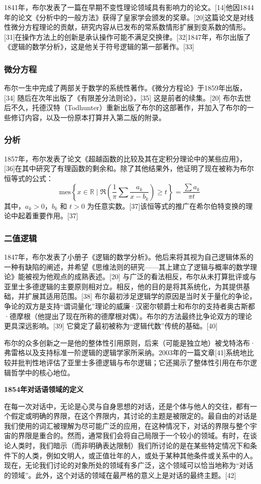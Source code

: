 1841年，布尔发表了一篇在早期不变性理论领域具有影响力的论文。[14]他因1844年的论文《分析中的一般方法》获得了皇家学会颁发的奖章。[20]这篇论文是对线性微分方程理论的贡献，研究内容从已发布的常系数情形扩展到变系数的情形。[31]在操作方法上的创新是承认操作可能不满足交换律。[32]1847年，布尔出版了《逻辑的数学分析》，这是他关于符号逻辑的第一部著作。[33]
\subsubsection{微分方程}  
布尔一生中完成了两部关于数学的系统性著作。《微分方程论》于1859年出版，[34] 随后在次年出版了《有限差分法则论》，[35] 这是前者的续集。[20] 布尔去世后不久，托德汉特（Todhunter）重新出版了布尔的这部著作，并加入了布尔的一些修订内容，以及一份原本打算并入第二版的附录。
\subsubsection{分析}  
1857年，布尔发表了论文《超越函数的比较及其在定积分理论中的某些应用》，[36]在其中研究了有理函数的剩余和。除了其他结果外，他证明了现在被称为布尔恒等式的公式：
\[
\mathrm{mes} \left\{ x \in \mathbb{R} \mid \Re \left( \frac{1}{\pi} \sum \frac{a_k}{x - b_k} \right) \geq t \right\} = \frac{\sum a_k}{\pi t}~
\]
其中，\( a_k > 0 \)，\( b_k \) 和 \( t > 0 \) 为任意实数。[37]该恒等式的推广在希尔伯特变换的理论中起着重要作用。[37]
\subsubsection{二值逻辑}  
1847年，布尔发表了小册子《逻辑的数学分析》。他后来将其视为自己逻辑体系的一种有缺陷的阐述，并希望《思维法则的研究——其上建立了逻辑与概率的数学理论》能被视为他观点的成熟表述。[20] 与广泛的看法相反，布尔从未打算批评或与亚里士多德逻辑的主要原则相对立。相反，他的目的是将其系统化，为其提供基础，并扩展其适用范围。[38] 布尔最初涉足逻辑学的原因是当时关于量化的争论，争论的双方是支持“谓词量化”理论的威廉·汉密尔顿爵士和布尔的支持者奥古斯都·德摩根（他提出了现在所称的德摩根对偶）。布尔的方法最终比争论双方的理论更具深远影响。[39] 它奠定了最初被称为“逻辑代数”传统的基础。[40]

布尔的众多创新之一是他的整体性引用原则，后来（可能是独立地）被戈特洛布·弗雷格以及支持标准一阶逻辑的逻辑学家所采纳。2003年的一篇文章[41]系统地比较并批判性地评估了亚里士多德逻辑与布尔逻辑；它还揭示了整体性引用在布尔逻辑哲学中的核心地位。

\textbf{1854年对话语领域的定义}  

在每一次对话中，无论是心灵与自身思想的对话，还是个体与他人的交往，都有一个假定或明确的界限，在这个界限内，其讨论的主题是被限定的。最自由的对话是我们使用的词汇被理解为尽可能广泛的应用，在这种情况下，对话的界限与整个宇宙的界限是重合的。然而，通常我们会将自己局限于一个较小的领域。有时，在谈论人类时，我们暗示（而非明确表达限制）我们所讨论的是在某些特定情况下和条件下的人类，例如文明人，或正值壮年的人，或处于某种其他条件或关系中的人。现在，无论我们讨论的对象所处的领域有多广泛，这个领域可以恰当地称为“对话的领域”。此外，这个对话的领域在最严格的意义上是对话的最终主题。[42]